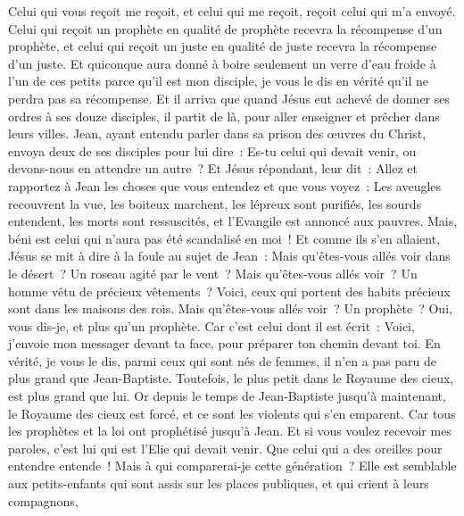 \begin{multicols}{2}
Celui qui vous reçoit me reçoit, et celui qui me reçoit, reçoit celui qui m'a envoyé.
Celui qui reçoit un prophète en qualité de prophète recevra la récompense d'un prophète, et celui qui reçoit un juste en qualité de juste recevra la récompense d'un juste.
Et quiconque aura donné à boire seulement un verre d'eau froide à l'un de ces petits parce qu'il est mon disciple, je vous le dis en vérité qu'il ne perdra pas sa récompense.
\VerseOne{}Et il arriva que quand Jésus eut achevé de donner ses ordres à ses douze disciples, il partit de là, pour aller enseigner et prêcher dans leurs villes.
Jean, ayant entendu parler dans sa prison des œuvres du Christ, envoya deux de ses disciples pour lui dire~:
Es-tu celui qui devait venir, ou devons-nous en attendre un autre~?
Et Jésus répondant, leur dit~: Allez et rapportez à Jean les choses que vous entendez et que vous voyez~:
Les aveugles recouvrent la vue, les boiteux marchent, les lépreux sont purifiés, les sourds entendent, les morts sont ressuscités, et l'Evangile est annoncé aux pauvres.
Mais, béni est celui qui n'aura pas été scandalisé en moi~!
Et comme ils s'en allaient, Jésus se mit à dire à la foule au sujet de Jean~: Mais qu'êtes-vous allés voir dans le désert~? Un roseau agité par le vent~?
Mais qu'êtes-vous allés voir~? Un homme vêtu de précieux vêtements~? Voici, ceux qui portent des habits précieux sont dans les maisons des rois.
Mais qu'êtes-vous allés voir~? Un prophète~? Oui, vous dis-je, et plus qu'un prophète.
Car c'est celui dont il est écrit~: Voici, j'envoie mon messager devant ta face, pour préparer ton chemin devant toi.
En vérité, je vous le dis, parmi ceux qui sont nés de femmes, il n'en a pas paru de plus grand que Jean-Baptiste. Toutefois, le plus petit dans le Royaume des cieux, est plus grand que lui.
Or depuis le temps de Jean-Baptiste jusqu'à maintenant, le Royaume des cieux est forcé, et ce sont les violents qui s'en emparent.
Car tous les prophètes et la loi ont prophétisé jusqu'à Jean.
Et si vous voulez recevoir mes paroles, c'est lui qui est l'Elie qui devait venir.
Que celui qui a des oreilles pour entendre entende~!
Mais à qui comparerai-je cette génération~? Elle est semblable aux petits-enfants qui sont assis sur les places publiques, et qui crient à leurs compagnons,

\end{multicols}
